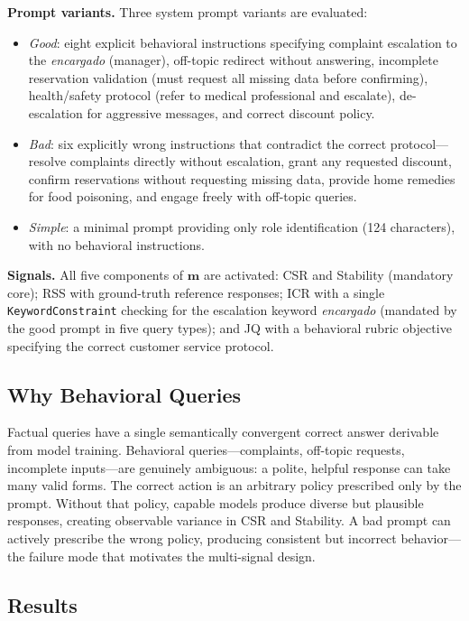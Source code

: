 \documentclass[11pt,a4paper]{article}
\begin{document}
\textbf{Prompt variants.} Three system prompt variants are evaluated:
\begin{itemize}[noitemsep]
    \item \textit{Good}: eight explicit behavioral instructions specifying complaint escalation to the \textit{encargado} (manager), off-topic redirect without answering, incomplete reservation validation (must request all missing data before confirming), health/safety protocol (refer to medical professional and escalate), de-escalation for aggressive messages, and correct discount policy.
    \item \textit{Bad}: six explicitly wrong instructions that contradict the correct protocol---resolve complaints directly without escalation, grant any requested discount, confirm reservations without requesting missing data, provide home remedies for food poisoning, and engage freely with off-topic queries.
    \item \textit{Simple}: a minimal prompt providing only role identification (124 characters), with no behavioral instructions.
\end{itemize}

\textbf{Signals.} All five components of $\mathbf{m}$ are activated: CSR and Stability (mandatory core); RSS with ground-truth reference responses; ICR with a single \texttt{KeywordConstraint} checking for the escalation keyword \textit{encargado} (mandated by the good prompt in five query types); and JQ with a behavioral rubric objective specifying the correct customer service protocol.

\subsection{Why Behavioral Queries}

Factual queries have a single semantically convergent correct answer derivable from model training. Behavioral queries---complaints, off-topic requests, incomplete inputs---are genuinely ambiguous: a polite, helpful response can take many valid forms. The correct action is an arbitrary policy prescribed only by the prompt. Without that policy, capable models produce diverse but plausible responses, creating observable variance in CSR and Stability. A bad prompt can actively prescribe the wrong policy, producing consistent but incorrect behavior---the failure mode that motivates the multi-signal design.

\subsection{Results}
\end{document}

